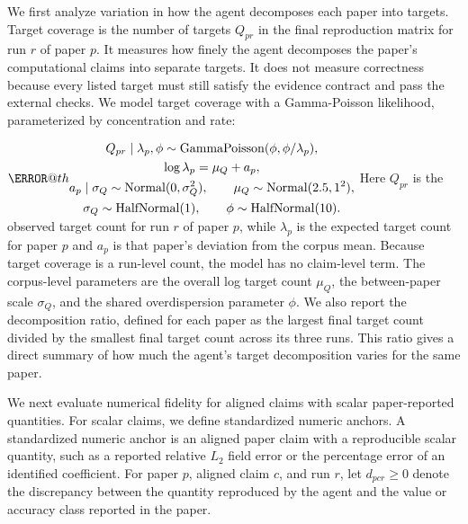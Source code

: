 \documentclass[authoryear,5p,times,nopreprintline]{elsarticle}
\makeatletter
\renewenvironment{equation}%
  {\@beginparpenalty\predisplaypenalty
   \@endparpenalty\postdisplaypenalty
   \refstepcounter{equation}%
   \trivlist\item[]\leavevmode
   \hb@xt@\linewidth\bgroup\hfil$\m@th\displaystyle}%
  {$\hfil\llap{\@eqnnum}\egroup
   \endtrivlist}
\makeatother
\begin{document}
We first analyze variation in how the agent decomposes each paper into targets.
Target coverage is the number of targets \(Q_{pr}\) in the final reproduction matrix for run \(r\) of paper \(p\).
It measures how finely the agent decomposes the paper's computational claims into separate targets.
It does not measure correctness because every listed target must still satisfy the evidence contract and pass the external checks.
We model target coverage with a Gamma-Poisson likelihood, parameterized by concentration and rate:
\begin{equation}
\begin{gathered}
Q_{pr}\mid \lambda_p,\phi \sim \mathrm{GammaPoisson}(\phi,\phi/\lambda_p),\\
\log \lambda_p = \mu_Q + a_p,\\
a_p\mid \sigma_Q \sim \mathrm{Normal}(0,\sigma_Q^2), \qquad
\mu_Q \sim \mathrm{Normal}(2.5,1^2),\\
\sigma_Q \sim \mathrm{HalfNormal}(1), \qquad
\phi \sim \mathrm{HalfNormal}(10).
\end{gathered}
\label{eq:coverage_model}
\end{equation}
Here \(Q_{pr}\) is the observed target count for run \(r\) of paper \(p\), while \(\lambda_p\) is the expected target count for paper \(p\) and \(a_p\) is that paper's deviation from the corpus mean.
Because target coverage is a run-level count, the model has no claim-level term.
The corpus-level parameters are the overall log target count \(\mu_Q\), the between-paper scale \(\sigma_Q\), and the shared overdispersion parameter \(\phi\).
We also report the decomposition ratio, defined for each paper as the largest final target count divided by the smallest final target count across its three runs.
This ratio gives a direct summary of how much the agent's target decomposition varies for the same paper.

We next evaluate numerical fidelity for aligned claims with scalar paper-reported quantities.
For scalar claims, we define standardized numeric anchors.
A standardized numeric anchor is an aligned paper claim with a reproducible scalar quantity, such as a reported relative \(L_2\) field error or the percentage error of an identified coefficient.
For paper \(p\), aligned claim \(c\), and run \(r\), let \(d_{pcr}\geq 0\) denote the discrepancy between the quantity reproduced by the agent and the value or accuracy class reported in the paper.
\end{document}
